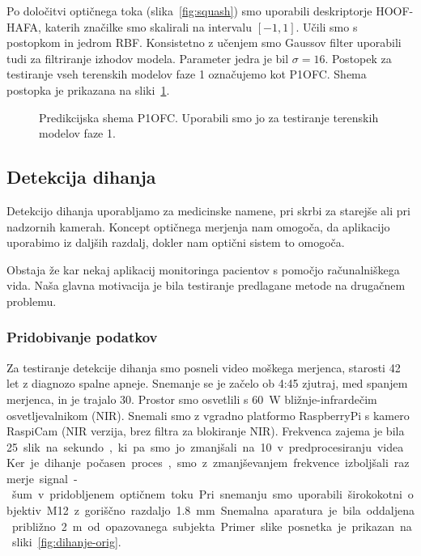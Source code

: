 Po določitvi optičnega toka (slika~\ref{fig:squash}) smo uporabili deskriptorje HOOF-HAFA, katerih značilke smo skalirali na intervalu $[-1,1]$. Učili smo s postopkom \esvr in jedrom RBF. Konsistetno z učenjem smo Gaussov filter uporabili tudi za filtriranje izhodov modela. Parameter jedra je bil $\sigma=16$. Postopek za testiranje vseh terenskih modelov faze 1 označujemo kot P1OFC. Shema postopka je prikazana na sliki~\ref{fig:diagram-procesiranja-field-stage1}.

\begin{figure}[!htb]
	\centering
	\resizebox{\columnwidth}{!}{}
	\caption[Predikcijska shema P1OFC]{Predikcijska shema P1OFC. Uporabili smo jo za testiranje terenskih modelov faze 1.}
	\label{fig:diagram-procesiranja-field-stage1}
\end{figure}

















\subsection{Detekcija dihanja}
Detekcijo dihanja uporabljamo za medicinske namene, pri skrbi za starejše ali pri nadzornih kamerah. Koncept optičnega merjenja nam omogoča, da aplikacijo uporabimo iz daljših razdalj, dokler nam optični sistem to omogoča. 

Obstaja že kar nekaj aplikacij monitoringa pacientov s pomočjo računalniškega vida. Naša glavna motivacija je bila testiranje predlagane metode na drugačnem problemu.

\subsubsection{Pridobivanje podatkov}
Za testiranje detekcije dihanja smo posneli video moškega merjenca, starosti 42 let z diagnozo spalne apneje. Snemanje se je začelo ob 4:45 zjutraj, med spanjem merjenca, in je trajalo \SI{30}{\min}. Prostor smo osvetlili s \SI{60}{\W} bližnje-infrardečim osvetljevalnikom (NIR). Snemali smo z vgradno platformo RaspberryPi s kamero RaspiCam (NIR verzija, brez filtra za blokiranje NIR). Frekvenca zajema je bila \SI{25} slik na sekundo, ki pa smo jo zmanjšali na \SI{10} v predprocesiranju videa. Ker je dihanje počasen proces, smo z zmanjševanjem frekvence izboljšali razmerje signal-šum v pridobljenem optičnem toku. Pri snemanju smo uporabili širokokotni objektiv M12 z goriščno razdaljo \SI{1.8}{mm}. Snemalna aparatura je bila oddaljena približno \SI{2}{m} od opazovanega subjekta. Primer slike posnetka je prikazan na sliki~\ref{fig:dihanje-orig}.

